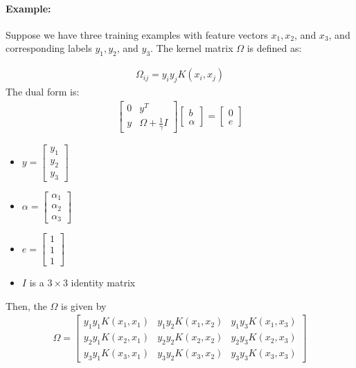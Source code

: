 \paragraph{Example: }Suppose we have three training examples with feature vectors $x_1, x_2$, and $x_3$, and corresponding labels $y_1, y_2$, and $y_3$. The kernel matrix $\Omega$ is defined as:

\begin{align*}
	\Omega_{ij} = y_i y_j K(x_i, x_j)
\end{align*}
The dual form is:
\begin{align*}
	\begin{bmatrix}
	0 & y^T \\
	y & \Omega + \frac{1}{\gamma} I
	\end{bmatrix}
	\begin{bmatrix}
	b \\
	\alpha
	\end{bmatrix}
	=
	\begin{bmatrix}
	0 \\
	e
	\end{bmatrix}
\end{align*}

\begin{itemize}
	\item $y = \begin{bmatrix} y_1 \\ y_2 \\ y_3 \end{bmatrix}$ 
	\item $\alpha = \begin{bmatrix} \alpha_1\\ \alpha_2 \\ \alpha_3 \end{bmatrix} $
	\item $e = \begin{bmatrix} 1 \\ 1 \\ 1 \end{bmatrix}$
	\item $I$ is a $3 \times 3$ identity matrix
\end{itemize}

Then, the $\Omega$ is given by
\begin{align*}
	\Omega = \begin{bmatrix}
	y_1 y_1 K(x_1, x_1) & y_1 y_2 K(x_1, x_2) & y_1 y_3 K(x_1, x_3) \\
	y_2 y_1 K(x_2, x_1) & y_2 y_2 K(x_2, x_2) & y_2 y_3 K(x_2, x_3) \\
	y_3 y_1 K(x_3, x_1) & y_3 y_2 K(x_3, x_2) & y_3 y_3 K(x_3, x_3)
	\end{bmatrix}
\end{align*}

